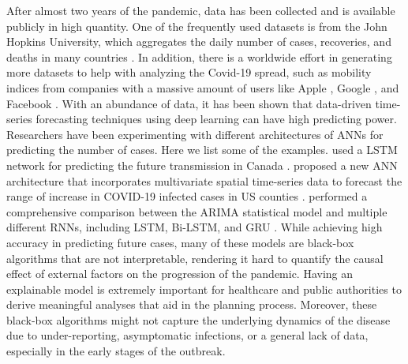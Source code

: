 After almost two years of the pandemic, data has been collected and is available publicly in high quantity.
One of the frequently used datasets is from the John Hopkins University, which aggregates the daily number of cases, recoveries, and deaths in many countries \cite{dongInteractiveWebbasedDashboard2020}.
In addition, there is a worldwide effort in generating more datasets to help with analyzing the Covid-19 spread, such as mobility indices from companies with a massive amount of users like Apple \cite{COVID19Mobility}, Google \cite{COVID19Mobility}, and Facebook \cite{DataGoodTools}.
With an abundance of data, it has been shown that data-driven time-series forecasting techniques using deep learning can have high predicting power.
Researchers have been experimenting with different architectures of \glspl{ANN} \cite{hecht-nielsenTheoryBackpropagationNeural} for predicting the number of cases.
Here we list some of the examples.
\citeauthor{chimmulaTimeSeriesForecasting2020} used a \gls{LSTM} network for predicting the future transmission in Canada \cite{chimmulaTimeSeriesForecasting2020}.
\citeauthor{ramchandaniDeepCOVIDNetInterpretableDeep2020} proposed a new \gls{ANN} architecture that incorporates multivariate spatial time-series data to forecast the range of increase in COVID-19 infected cases in \gls{US} counties \cite{ramchandaniDeepCOVIDNetInterpretableDeep2020}.
\citeauthor{shahidPredictionsCOVID19Deep2020} performed a comprehensive comparison between the \gls{ARIMA} statistical model and multiple different \glspl{RNN}, including \gls{LSTM}, \gls{Bi-LSTM}, and \gls{GRU} \cite{shahidPredictionsCOVID19Deep2020}.
While achieving high accuracy in predicting future cases, many of these models are black-box algorithms that are not interpretable, rendering it hard to quantify the causal effect of external factors on the progression of the pandemic.
Having an explainable model is extremely important for healthcare and public authorities to derive meaningful analyses that aid in the planning process.
Moreover, these black-box algorithms might not capture the underlying dynamics of the disease due to under-reporting, asymptomatic infections, or a general lack of data, especially in the early stages of the outbreak.

